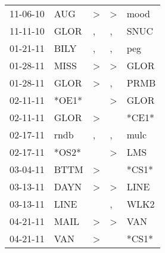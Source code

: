 \begin{supertabular}{p{0.07\textwidth}p{0.06\textwidth}p{0.02\textwidth}p{0.02\textwidth}p{0.06\textwidth}}
          11-06-10\textsuperscript{} &            AUG\textsuperscript{} &     \textgreater &     \textgreater &           mood\textsuperscript{} \\
          11-11-10\textsuperscript{} &           GLOR\textsuperscript{} &                , &                , &           SNUC\textsuperscript{} \\
          01-21-11\textsuperscript{} &           BILY\textsuperscript{} &                , &                , &            peg\textsuperscript{} \\
          01-28-11\textsuperscript{} &           MISS\textsuperscript{} &     \textgreater &     \textgreater &           GLOR\textsuperscript{} \\
          01-28-11\textsuperscript{} &           GLOR\textsuperscript{} &     \textgreater &                , &           PRMB\textsuperscript{} \\
          02-11-11\textsuperscript{} &                            *OE1* &                  &     \textgreater &           GLOR\textsuperscript{} \\
          02-11-11\textsuperscript{} &           GLOR\textsuperscript{} &     \textgreater &                  &                            *CE1* \\
          02-17-11\textsuperscript{} &           rndb\textsuperscript{} &                , &                , &           mulc\textsuperscript{} \\
          02-17-11\textsuperscript{} &                            *OS2* &                  &     \textgreater &            LMS\textsuperscript{} \\
          03-04-11\textsuperscript{} &           BTTM\textsuperscript{} &     \textgreater &                  &                            *CS1* \\
          03-13-11\textsuperscript{} &           DAYN\textsuperscript{} &     \textgreater &     \textgreater &           LINE\textsuperscript{} \\
          03-13-11\textsuperscript{} &           LINE\textsuperscript{} &                  &                , &           WLK2\textsuperscript{} \\
          04-21-11\textsuperscript{} &           MAIL\textsuperscript{} &     \textgreater &     \textgreater &            VAN\textsuperscript{} \\
          04-21-11\textsuperscript{} &            VAN\textsuperscript{} &     \textgreater &                  &                            *CS1* \\

\end{supertabular}
